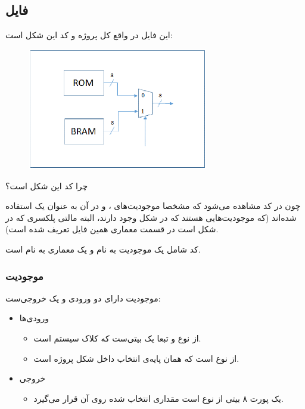 \documentclass[dvipsnames, svgnames, x11names, a4paper, 11pt]{article}
\begin{document}
\subsection{فایل }
این فایل در واقع کل پروژه و کد این شکل است:
\begin{figure}[H]
\begin{center}
\includegraphics[width=0.7\textwidth, height=0.3\textheight]{images/project}
\end{center}
\end{figure}
چرا کد این شکل است؟

چون در کد مشاهده‌ می‌شود که مشخصا موجودیت‌های 
،
و
در آن به عنوان یک 
استفاده شده‌اند (که موجودیت‌هایی هستند که در شکل وجود دارند، البته مالتی پلکسری که در شکل است در قسمت معماری همین فایل تعریف شده است).

کد شامل یک موجودیت به نام
و یک معماری به نام
است.

\subsubsection{موجودیت }
موجودیت دارای دو ورودی و یک خروجی‌ست:
\begin{itemize}
\item 
ورودی‌ها

\begin{itemize}
\item {}

از نوع 
و تبعا یک بیتی‌ست که کلاک سیستم است.

\item  {}

از نوع 
است که همان پایه‌ی انتخاب داخل شکل پروژه است.

\end{itemize}

\item 
خروجی
\begin{itemize}
\item {}

یک پورت ۸ بیتی از نوع 
است مقداری انتخاب شده روی آن قرار می‌گیرد.

\end{itemize}

\end{itemize}
\end{document}
